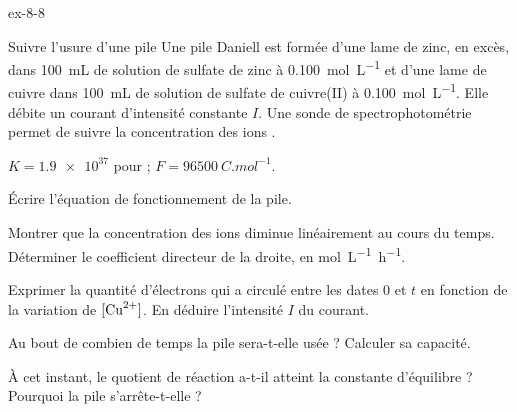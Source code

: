 \begin{blocLivre}{ex-8-8}
\begin{exercice}[2]{Suivre l'usure d'une pile}
Une pile Daniell est formée d'une lame de zinc, en excès, dans 100~mL de solution de sulfate de zinc à
\qty{0,100}{mol.L^{-1}} et d'une lame de cuivre dans 100~mL de solution de sulfate de cuivre(II) à \qty{0,100}{mol.L^{-1}}.
Elle débite un courant d'intensité constante $I$. Une sonde de spectrophotométrie permet de suivre la concentration des
ions .
\begin{donnees}
$K=\num{1.9e37}$ pour  ; $F=\qty{96500}{C.mol^{-1}}$.
\end{donnees}
\begin{questions}
\item Écrire l'équation de fonctionnement de la pile.
\item Montrer que la concentration des ions  diminue linéairement au cours du temps. Déterminer le
coefficient directeur de la droite, en \unit{mol.L^{-1}.h^{-1}}.
\item Exprimer la quantité d'électrons qui a circulé entre les dates 0 et $t$ en fonction de la variation de
$[\ce{Cu^2+}]$. En déduire l'intensité $I$ du courant.
\item Au bout de combien de temps la pile sera-t-elle usée ? Calculer sa capacité.
\item À cet instant, le quotient de réaction a-t-il atteint la constante d'équilibre ? Pourquoi la pile s'arrête-t-elle ?
\end{questions}
\end{exercice}
\end{blocLivre}
